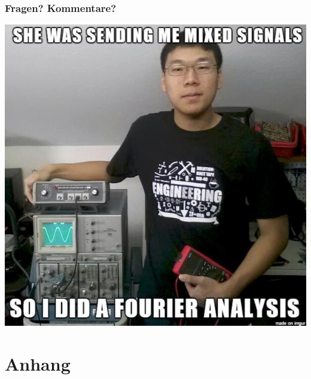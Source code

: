 \documentclass[
	11pt, %
]{beamer}
\begin{document}
\begin{frame}
		\frametitle{Fragen? Kommentare?}
	\begin{center}
	\includegraphics[scale=0.35]{ms}
	\end{center}
\end{frame}
\section{Anhang}
\end{document}
